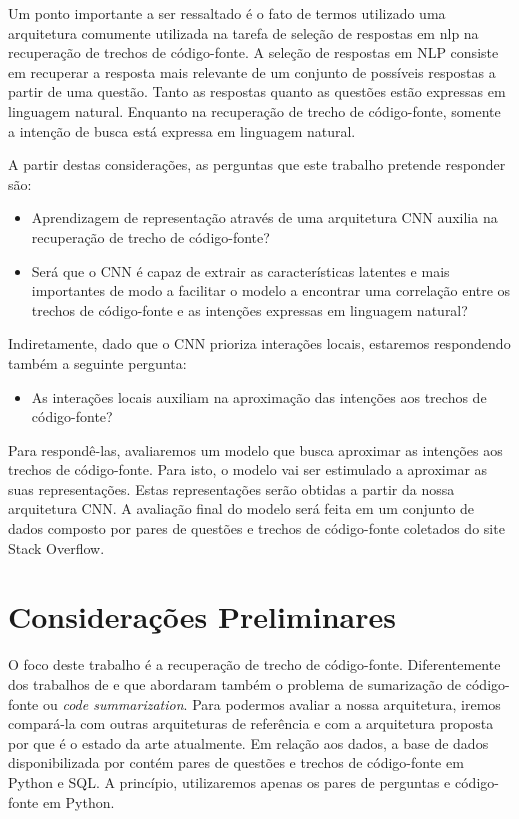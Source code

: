 Um ponto importante a ser ressaltado é o fato de termos utilizado uma arquitetura comumente utilizada na tarefa de seleção de respostas em \acrshort{nlp} na recuperação de trechos de código-fonte. A seleção de respostas em NLP consiste em recuperar a resposta mais relevante de um conjunto de possíveis respostas a partir de uma questão. Tanto as respostas quanto as questões estão expressas em linguagem natural. Enquanto na recuperação de trecho de código-fonte, somente a intenção de busca está expressa em linguagem natural.  

A partir destas considerações, as perguntas que este trabalho pretende responder são:

\begin{itemize}
    \item Aprendizagem de representação através de uma arquitetura CNN auxilia na recuperação de trecho de código-fonte?
    
    \item Será que o CNN é capaz de extrair as características latentes e mais importantes de modo a facilitar o modelo a encontrar uma correlação entre os trechos de código-fonte e as intenções expressas em linguagem natural?
\end{itemize}

Indiretamente, dado que o CNN prioriza interações locais, estaremos respondendo também a seguinte pergunta:
\begin{itemize}
        \item As interações locais auxiliam na aproximação das intenções aos trechos de código-fonte?
\end{itemize}

Para respondê-las, avaliaremos um modelo que busca aproximar as intenções aos trechos de código-fonte. Para isto, o modelo vai ser estimulado a aproximar as suas representações. Estas representações serão obtidas a partir da nossa arquitetura CNN. A avaliação final do modelo será feita em um conjunto de dados composto por pares de questões e trechos de código-fonte coletados do site Stack Overflow. 


\section{Considerações Preliminares}
\label{sec:consideracoes_preliminares}

O foco deste trabalho é a recuperação de trecho de código-fonte. Diferentemente dos trabalhos de \cite{iyer-etal-2016-summarizing} e \cite{Allamanis-bimodal-source-code-natural-language:2015} que abordaram também o problema de sumarização de código-fonte ou \textit{code summarization}. Para podermos avaliar a nossa arquitetura, iremos compará-la com outras arquiteturas de referência e com a arquitetura proposta por \cite{cambronero-deep-learning-code-search:2019} que é o estado da arte atualmente. Em relação aos dados, a base de dados disponibilizada por \cite{yao-2018} contém pares de questões e trechos de código-fonte em Python e SQL. A princípio, utilizaremos apenas os pares de perguntas e código-fonte em Python.


